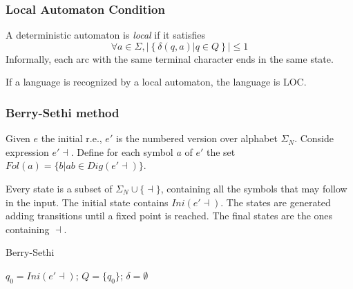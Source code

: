 \subsubsection{Local Automaton Condition}
A deterministic automaton is \emph{local} if it satisfies
\begin{equation*}
    \forall a \in \Sigma, | \left\{ \delta(q, a) | q \in Q \right\} | \le 1
\end{equation*}
Informally, each arc with the same terminal character ends in the same state.

If a language is recognized by a local automaton, the language is LOC.

\subsubsection{Berry-Sethi method}

Given $e$ the initial r.e., $e'$ is the numbered version over alphabet $\Sigma_N$. Conside expression $e' \dashv$. Define for each symbol $a$ of $e'$ the set $Fol(a) = \{b | ab \in Dig(e'\dashv)\}$.

Every state is a subset of $\Sigma_N \cup \{\dashv\}$, containing all the symbols that may follow in the input. The initial state contains $Ini(e'\dashv)$. The states are generated adding transitions until a fixed point is reached. The final states are the ones containing $\dashv$.

\begin{algorithm*}[H]
    \caption{Berry-Sethi}
    \SetAlgoLined
    $q_0 = Ini(e'\dashv)$;
    $Q = \{q_0\}$;
    $\delta=\emptyset$\;
\end{algorithm*}
